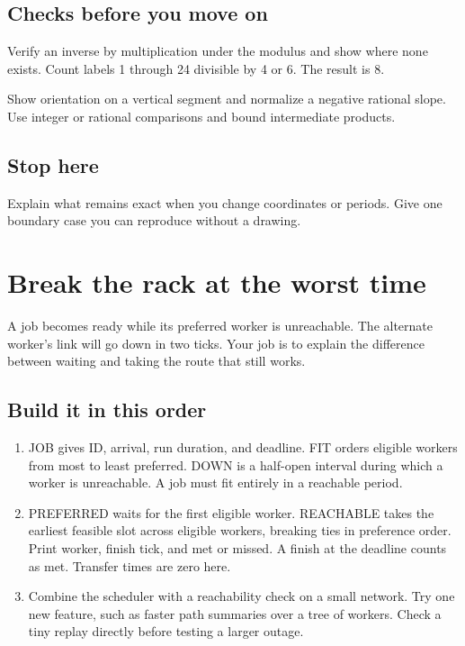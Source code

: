 \documentclass[11pt,letterpaper]{article}
\begin{document}
\subsection*{Checks before you move on}

Verify an inverse by multiplication under the modulus and show where none exists. Count labels 1 through 24 divisible by 4 or 6. The result is 8.

Show orientation on a vertical segment and normalize a negative rational slope. Use integer or rational comparisons and bound intermediate products.

\subsection*{Stop here}

Explain what remains exact when you change coordinates or periods. Give one boundary case you can reproduce without a drawing.

\clearpage

\section{Break the rack at the worst time}\label{datacenter:10}

A job becomes ready while its preferred worker is unreachable. The alternate worker's link will go down in two ticks. Your job is to explain the difference between waiting and taking the route that still works.

\subsection*{Build it in this order}

\begin{enumerate}
\item JOB gives ID, arrival, run duration, and deadline. FIT orders eligible workers from most to least preferred. DOWN is a half-open interval during which a worker is unreachable. A job must fit entirely in a reachable period.
\item PREFERRED waits for the first eligible worker. REACHABLE takes the earliest feasible slot across eligible workers, breaking ties in preference order. Print worker, finish tick, and met or missed. A finish at the deadline counts as met. Transfer times are zero here.
\item Combine the scheduler with a reachability check on a small network. Try one new feature, such as faster path summaries over a tree of workers. Check a tiny replay directly before testing a larger outage.
\end{enumerate}
\end{document}
